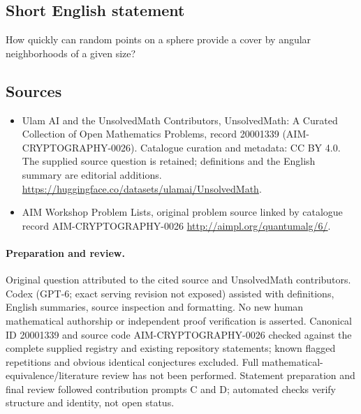\documentclass[11pt]{article}
\begin{document}
\subsection{Short English statement}
How quickly can random points on a sphere provide a cover by angular neighborhoods of a given size?
\subsection{Sources}
\begin{itemize}
\item[\hypertarget{source:20001339:1}{S1}] Ulam AI and the UnsolvedMath Contributors, UnsolvedMath: A Curated Collection of Open Mathematics Problems, record 20001339 (AIM-CRYPTOGRAPHY-0026). Catalogue curation and metadata: CC BY 4.0. The supplied source question is retained; definitions and the English summary are editorial additions.
\url{https://huggingface.co/datasets/ulamai/UnsolvedMath}.
\item[\hypertarget{source:20001339:2}{S2}] AIM Workshop Problem Lists, original problem source linked by catalogue record AIM-CRYPTOGRAPHY-0026
\url{http://aimpl.org/quantumalg/6/}.
\end{itemize}
\paragraph{Preparation and review.}
Original question attributed to the cited source and UnsolvedMath contributors. Codex (GPT-6; exact serving revision not exposed) assisted with definitions, English summaries, source inspection and formatting. No new human mathematical authorship or independent proof verification is asserted. Canonical ID 20001339 and source code AIM-CRYPTOGRAPHY-0026 checked against the complete supplied registry and existing repository statements; known flagged repetitions and obvious identical conjectures excluded. Full mathematical-equivalence/literature review has not been performed. Statement preparation and final review followed contribution prompts C and D; automated checks verify structure and identity, not open status.
\label{end:20001339}
\end{document}
